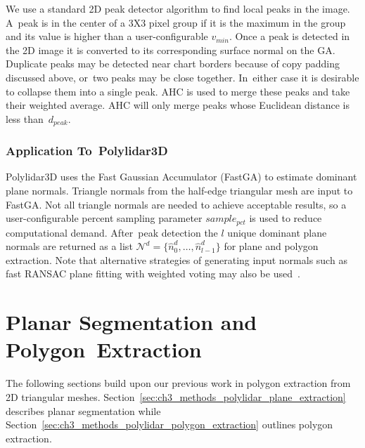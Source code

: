 We use a standard 2D peak detector algorithm to find local peaks in the image. A~peak is in the center of a 3X3 pixel group if it is the maximum in the group and its value is higher than a user-configurable $v_{min}$. Once a peak is detected in the 2D image it is converted to its corresponding surface normal on the GA. Duplicate peaks may be detected near chart borders because of copy padding discussed above, or~two peaks may be close together. In~either case it is desirable to collapse them into a single peak.  \ac{AHC} is used to merge these peaks and take their weighted average. \ac{AHC} will only merge peaks whose Euclidean distance is less than~$d_{peak}$. 





\subsubsection{Application To~Polylidar3D} %

Polylidar3D uses the Fast Gaussian Accumulator (FastGA) to estimate dominant plane normals. Triangle normals from the half-edge triangular mesh are input to FastGA. Not all triangle normals are needed to achieve acceptable results, so a user-configurable percent sampling parameter $sample_{pct}$ is used to reduce computational demand. After~peak detection the $l$ unique dominant plane normals are returned as a list  $\mathcal{N}^d = \{\hat{n}^d_0, \ldots, \hat{n}^d_{l-1} \}$ for plane and polygon extraction. Note that alternative strategies of generating input normals such as fast RANSAC plane fitting with weighted voting may also be used~\cite{limberger_real-time_2015}.

\section{Planar Segmentation and Polygon~Extraction}\label{sec:ch3_methods_polylidar}

The following sections build upon our previous work in polygon extraction from 2D triangular meshes. Section~\ref{sec:ch3_methods_polylidar_plane_extraction} describes planar segmentation while Section~\ref{sec:ch3_methods_polylidar_polygon_extraction} outlines polygon extraction. 



